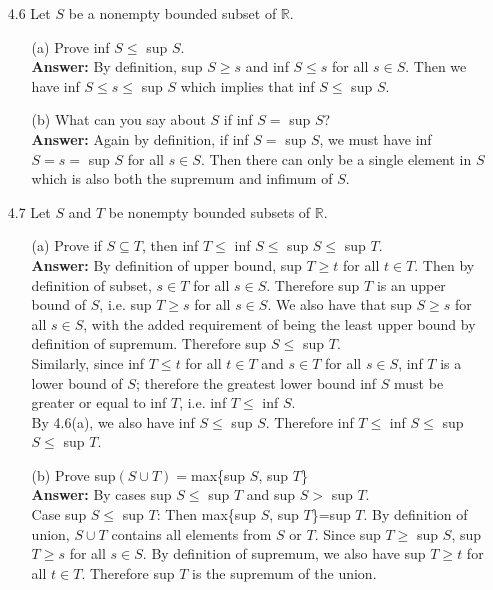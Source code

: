 \documentclass{article}
\begin{document}
\begin{itemize}
    \item [4.6] Let $S$ be a nonempty bounded subset of $\mathbb{R}$.
          \begin{itemize}
              \item [(a)] Prove inf $S\leq$ sup $S$.\\
                    \textbf{Answer: } By definition, sup $S\geq s$ and inf $S\leq s$ for all $s\in S$. Then we have inf $S\leq s\leq$ sup $S$ which implies that inf $S\leq$ sup $S$.
              \item [(b)] What can you say about $S$ if inf $S=$ sup $S$?\\
                    \textbf{Answer: } Again by definition, if inf $S=$ sup $S$, we must have inf $S=s=$ sup $S$ for all $s\in S$. Then there can only be a single element in $S$ which is also both the supremum and infimum of $S$.
          \end{itemize}
    \item [4.7] Let $S$ and $T$ be nonempty bounded subsets of $\mathbb{R}$.
          \begin{itemize}
              \item [(a)] Prove if $S\subseteq T$, then inf $T\leq$ inf $S\leq$ sup $S\leq$ sup $T$.\\
                    \textbf{Answer: } By definition of upper bound, sup $T\geq t$ for all $t\in T$. Then by definition of subset, $s\in T$ for all $s\in S$. Therefore sup $T$ is an upper bound of $S$, i.e. sup $T\geq s$ for all $s\in S$. We also have that sup $S\geq s$ for all $s\in S$, with the added requirement of being the least upper bound by definition of supremum. Therefore sup $S\leq$ sup $T$.\\
                    Similarly, since inf $T\leq t$ for all $t\in T$ and $s\in T$ for all $s\in S$, inf $T$ is a lower bound of $S$; therefore the greatest lower bound inf $S$ must be greater or equal to inf $T$, i.e. inf $T\leq$ inf $S$.\\
                    By 4.6(a), we also have inf $S\leq$ sup $S$. Therefore inf $T\leq$ inf $S\leq$ sup $S\leq$ sup $T$.
              \item [(b)] Prove sup$(S\cup T)=$max\{sup $S$, sup $T$\}\\
                    \textbf{Answer: } By cases sup $S\leq$ sup $T$ and sup $S>$ sup $T$.\\
                    Case sup $S\leq$ sup $T$: Then max\{sup $S$, sup $T$\}=sup $T$. By definition of union, $S\cup T$ contains all elements from $S$ or $T$. Since sup $T\geq$ sup $S$, sup $T\geq s$ for all $s\in S$. By definition of supremum, we also have sup $T\geq t$ for all $t\in T$. Therefore sup $T$ is the supremum of the union.\\

\end{itemize}
\end{itemize}
\end{document}
